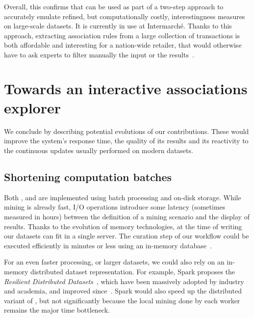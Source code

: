 Overall, this confirms that \toppi can be used as part of a two-step approach to accurately emulate refined,
but computationally costly, interestingness measures on large-scale datasets.
It is currently in use at Intermarch\'e.
Thanks to this approach,
extracting association rules from a large collection of transactions is both affordable and interesting for a nation-wide retailer,
that would otherwise have to ask experts to filter manually the input or the results~\cite{SuganthanSIGMOD15}.







\section{Towards an interactive associations explorer}
\label{sec:evolutions}

We conclude by describing potential evolutions of our contributions.
These would improve the system's response time,
the quality of its results and
its reactivity to the continuous updates usually performed on modern datasets.

\subsection{Shortening computation batches}

Both \jlcm, \capa and \toppi are implemented using batch processing and on-disk storage.
While mining is already fast,
I/O operations introduce some latency (sometimes measured in hours)
between the definition of a mining scenario and the display of results.
Thanks to the evolution of memory technologies,
at the time of writing our datasets can fit in a single server.
The curation step of our workflow could be executed efficiently in minutes or less
using an in-memory database~\cite{lindstrom2013ibm,LeeICDE13}.

For an even faster processing, or larger datasets,
we could also rely on an in-memory distributed dataset representation.
For example, Spark proposes the {\em Resilient Distributed Datasets}~\cite{ZahariaHC10},
which have been massively adopted by industry and academia,
and improved since~\cite{ArmbrustSIGMOD15}.
Spark would also speed up the distributed variant of \toppi,
but not significantly because the local mining done by each worker remains the major time bottleneck.

